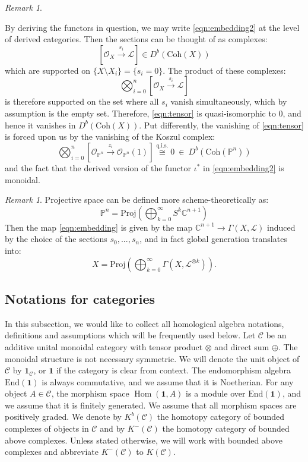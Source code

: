 \documentclass[12pt]{amsart}
\numberwithin{equation}{section}
\theoremstyle{definition}
\theoremstyle{remark}
\newtheorem{remark}[theorem]{Remark}
\DeclareMathOperator{\Hom}{Hom}
\newcommand{\CC}{\mathbb{C}}
\newcommand{\PP}{\mathbb{P}}
\newcommand{\cat}{\mathcal{C}}
\newcommand{\CL}{\mathcal{L}}
\newcommand{\CO}{\mathcal{O}}
\renewcommand{\1}{\mathbf{1}}
\newcommand{\coh}{\mathrm{Coh}}
\newcommand{\End}{\mathrm{End}}
\newcommand{\qis}{\mathrm{q.i.s.}}
\newcommand{\proj}{\mathrm{Proj}}
\begin{document}
\begin{remark}
\label{rem:prod cones}

By deriving the functors in question, we may write \eqref{eqn:embedding2} at the level of derived categories. Then the sections can be thought of as complexes:
$$
\left[ \CO_X \stackrel{s_i}\rightarrow \CL \right] \in D^b(\coh(X))
$$
which are supported on $\{ X\setminus X_i \} = \{s_i=0\}$. The product of these complexes: 
\begin{equation}
\label{eqn:tensor}
\bigotimes_{i=0}^{n} \left[ \CO_X \stackrel{s_i}\rightarrow \CL \right]
\end{equation}
is therefore supported on the set where all $s_i$ vanish simultaneously, which by assumption is the empty set. Therefore, \eqref{eqn:tensor} is quasi-isomorphic to 0, and hence it vanishes in $D^b(\coh(X))$. Put differently, the vanishing of \eqref{eqn:tensor} is forced upon us by the vanishing of the Koszul complex:
$$
\bigotimes_{i=0}^{n} \left[ \CO_{\PP^n} \stackrel{z_i}\rightarrow \CO_{\PP^n}(1) \right] \stackrel{\qis}\cong 0 \ \in \ D^b(\coh(\PP^n))
$$
and the fact that the derived version of the functor $\iota^*$ in \eqref{eqn:embedding2} is monoidal.

\end{remark}

\begin{remark} Projective space can be defined more scheme-theoretically as: 
$$
\PP^n = \proj\left(\bigoplus_{k=0}^{\infty} S^k\CC^{n+1} \right)
$$
Then the map \eqref{eqn:embedding} is given by the map %
$\CC^{n+1} \to \Gamma(X,\CL)$ induced by the choice of the sections $s_0,...,s_n$, and in fact global generation translates into:
$$
X = \proj\left(\bigoplus_{k=0}^{\infty} \Gamma(X,\CL^{\otimes k}) \right).
$$

\end{remark}

\subsection{Notations for categories}
\label{def:cat}

In this subsection, we would like to collect all homological algebra notations, definitions and assumptions which will be frequently used below. Let $\cat$ be an additive unital monoidal category with tensor product $\otimes$ and direct sum $\oplus$. The monoidal structure is not necessary symmetric. We will denote the unit object of $\cat$ by $\1_{\cat}$, or $\1$ if the category is clear from context. The endomorphism algebra $\End(\1)$ is always commutative, and we assume that it is Noetherian. For any object $A\in \cat$, the morphism space $\Hom(\1,A)$ is a module over  $\End(\1)$, and we assume that it is finitely generated. We assume that all morphism spaces are positively graded.  We denote by $K^b(\cat)$ the homotopy category of bounded complexes of objects in $\cat$ and by $K^-(\cat)$ the 
homotopy category of bounded above complexes. Unless stated otherwise, we will work with bounded above complexes and abbreviate $K^-(\cat)$ to $K(\cat)$. 
\end{document}
